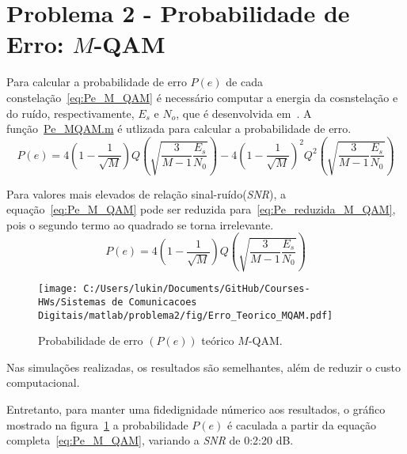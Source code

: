 \section{Problema 2 - Probabilidade de Erro: \texorpdfstring{$M$}{M}-QAM}
Para calcular a probabilidade de erro $P(e)$ de cada constelação~\ref{eq:Pe_M_QAM} é necessário computar a energia da cosnstelação e do ruído, respectivamente, $E_s$ e $N_o$, que é desenvolvida em~\cite{Cecilio}. A função~\href{https://raw.githubusercontent.com/lucasabdalah/Courses-HWs/SCD/Sistemas%20de%20Comunicacoes%20Digitais/matlab/problema2/Pe_MQAM.m}{\colorbox{cyan!10}{Pe\_MQAM.m}} é utlizada para calcular a probabilidade de erro.
\begin{equation}
    P(e) = 4 \left(1-\frac{1}{\sqrt{M}}\right) Q\left(\sqrt{\frac{3}{M-1}\frac{E_s}{N_0}}\right) - 4\left(1-\frac{1}{\sqrt{M}}\right)^2 Q^2\left(\sqrt{\frac{3}{M-1}\frac{E_s}{N_0}}\right)
    \label{eq:Pe_M_QAM}
\end{equation}

Para valores mais elevados de relação sinal-ruído(\textit{SNR}), a equação~\ref{eq:Pe_M_QAM} pode ser reduzida para~\ref{eq:Pe_reduzida_M_QAM}, pois o segundo termo ao quadrado se torna irrelevante.
\begin{equation}
    P(e) = 4 \left(1-\frac{1}{\sqrt{M}}\right) Q\left(\sqrt{\frac{3}{M-1}\frac{E_s}{N_0}}\right)
    \label{eq:Pe_reduzida_M_QAM}
\end{equation}

\begin{figure}[!ht]
    \centering
    \texttt{[image: C:/Users/lukin/Documents/GitHub/Courses-HWs/Sistemas de Comunicacoes Digitais/matlab/problema2/fig/Erro\_Teorico\_MQAM.pdf]}
    \caption{Probabilidade de erro $(P(e))$ teórico $M$-QAM.}
    \label{fig:Erro_Teorico_MQAM}
\end{figure}

Nas simulações realizadas, os resultados são semelhantes, além de reduzir o custo computacional.

Entretanto, para manter uma fidedignidade númerico aos resultados, o gráfico mostrado na figura~\ref{fig:Erro_Teorico_MQAM} a probabilidade $P(e)$ é caculada a partir da equação completa~\ref{eq:Pe_M_QAM}, variando a \textit{SNR} de 0:2:20 dB.